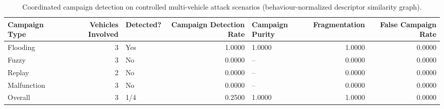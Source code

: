 \begin{table}[t]
\centering
\begin{tabular}{lrlrlrr}
\toprule
Campaign Type & Vehicles Involved & Detected? & Campaign Detection Rate & Campaign Purity & Fragmentation & False Campaign Rate \\
\midrule
Flooding & 3 & Yes & 1.0000 & 1.0000 & 1.0000 & 0.0000 \\
Fuzzy & 3 & No & 0.0000 & -- & 0.0000 & 0.0000 \\
Replay & 2 & No & 0.0000 & -- & 0.0000 & 0.0000 \\
Malfunction & 3 & No & 0.0000 & -- & 0.0000 & 0.0000 \\
Overall & 3 & 1/4 & 0.2500 & 1.0000 & 1.0000 & 0.0000 \\
\bottomrule
\end{tabular}
\caption{Coordinated campaign detection on controlled multi-vehicle attack scenarios (behaviour-normalized descriptor similarity graph).}
\label{tab:campaign-detection-results}
\end{table}

